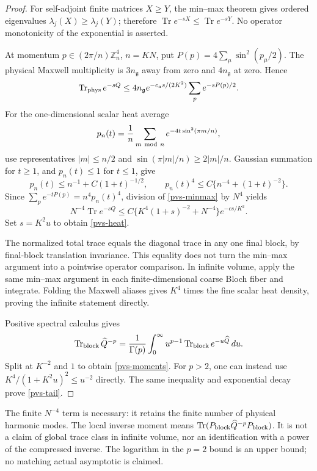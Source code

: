 \begin{proof}
For self-adjoint finite matrices \(X\ge Y\), the min--max theorem
gives ordered eigenvalues \(\lambda_j(X)\ge\lambda_j(Y)\);
therefore \(\operatorname{Tr}e^{-sX}\le
\operatorname{Tr}e^{-sY}\).
No operator monotonicity of the exponential is asserted.

At momentum \(p\in(2\pi/n)\mathbb Z_n^4\), \(n=KN\), put
\(P(p)=4\sum_\mu\sin^2(p_\mu/2)\).
The physical Maxwell multiplicity is \(3n_{\mathfrak g}\)
away from zero and \(4n_{\mathfrak g}\) at zero. Hence
\begin{equation}
 \operatorname{Tr}_{\rm phys}e^{-sQ}
 \le 4n_{\mathfrak g}e^{-c_as/(2K^2)}
                       \sum_p e^{-sP(p)/2}.
 \label{pvs-minmax}
\end{equation}
For the one-dimensional scalar heat average
\[
 p_n(t)=\frac1n\sum_{m\ {\rm mod}\ n}
                      e^{-4t\sin^2(\pi m/n)},
\]
use representatives \(|m|\le n/2\) and
\(\sin(\pi|m|/n)\ge2|m|/n\).
Gaussian summation for \(t\ge1\), and \(p_n(t)\le1\) for
\(t\le1\), give
\begin{equation}
 p_n(t)\le n^{-1}+C(1+t)^{-1/2},\qquad
 p_n(t)^4\le C\{n^{-4}+(1+t)^{-2}\}.
 \label{pvs-scalar-heat}
\end{equation}
Since \(\sum_p e^{-tP(p)}=n^4p_n(t)^4\),
division of \eqref{pvs-minmax} by \(N^4\) yields
\[
 N^{-4}\operatorname{Tr}e^{-sQ}
 \le C\{K^4(1+s)^{-2}+N^{-4}\}e^{-cs/K^2}.
\]
Set \(s=K^2u\) to obtain \eqref{pvs-heat}.

The normalized total trace equals the diagonal trace in any one
final block, by final-block translation invariance.
This equality does not turn the min--max argument into a
pointwise operator comparison.
In infinite volume, apply the same min--max argument in each
finite-dimensional coarse Bloch fiber and integrate.
Folding the Maxwell aliases gives \(K^4\) times the fine scalar
heat density, proving the infinite statement directly.

Positive spectral calculus gives
\[
 \operatorname{Tr}_{\rm block}\widehat Q^{-p}
  =\frac1{\Gamma(p)}\int_0^\infty
      u^{p-1}\operatorname{Tr}_{\rm block}e^{-u\widehat Q}\,du .
\]
Split at \(K^{-2}\) and \(1\) to obtain
\eqref{pvs-moments}.
For \(p>2\), one can instead use
\(K^4/(1+K^2u)^2\le u^{-2}\) directly.
The same inequality and exponential decay prove
\eqref{pvs-tail}.
\end{proof}

The finite \(N^{-4}\) term is necessary: it retains the finite
number of physical harmonic modes.
The local inverse moment means
\(\operatorname{Tr}(P_{\rm block}\widehat Q^{-p}P_{\rm block})\).
It is not a claim of global trace class in infinite volume, nor
an identification with a power of the compressed inverse.
The logarithm in the \(p=2\) bound is an upper bound; no matching
actual asymptotic is claimed.

